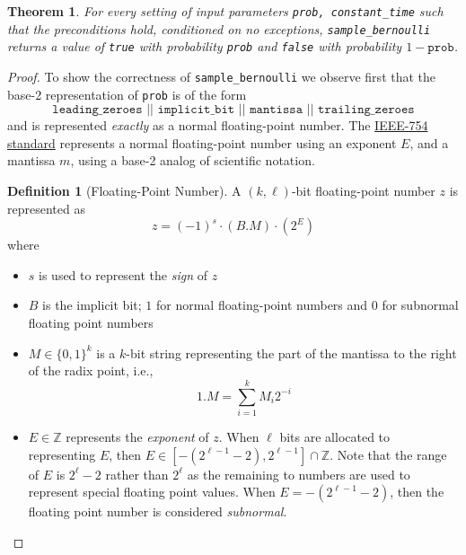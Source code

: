 \documentclass[11pt,a4paper]{article}
\newtheorem{theorem}{Theorem}[section]
\theoremstyle{definition}
\newtheorem{definition}{Definition}
\begin{document}
\begin{tcolorbox}
\begin{theorem} For every setting of input parameters \texttt{prob, constant\_time} such that the preconditions hold, conditioned on no exceptions, \texttt{sample\_bernoulli} returns a value of \texttt{true} with probability \texttt{prob} and \texttt{false} with probability $1 - \texttt{prob}$. 
\end{theorem}
\end{tcolorbox}

\begin{proof} 
To show the correctness of \texttt{sample\_bernoulli} we observe first that the base-2 representation of \texttt{prob} is of the form 
\[
\texttt{leading\_zeroes || implicit\_bit || mantissa || trailing\_zeroes}
\]
and is represented \emph{exactly} as a normal floating-point number. The \href{https://en.wikipedia.org/wiki/IEEE_754}{IEEE-754 standard} represents a normal floating-point number using an exponent $E$, and a mantissa $m$, using a base-2 analog of scientific notation. 

\begin{definition}[Floating-Point Number]
A $(k,\ell)$-bit floating-point number $z$ is represented as
\[
z = (-1)^s \cdot (B.M) \cdot (2^E) 
\]
where
\begin{itemize}
    \item $s$ is used to represent the \emph{sign} of $z$
    \item $B$ is the implicit bit; $1$ for normal floating-point numbers and $0$ for subnormal floating point numbers
    \item $M \in \{0,1\}^k$ is a $k$-bit string representing the part of the mantissa to the right of the radix point, i.e.,
    \[
    1.M = \sum_{i = 1}^k M_i2^{-i}
    \]
    \item $E \in \mathbb{Z}$ represents the \emph{exponent} of $z$. When $\ell$ bits are allocated to representing $E$, then $E \in [-(2^{\ell - 1} - 2), 2^{\ell - 1}] \cap \mathbb{Z}$. Note that the range of $E$ is $2^\ell - 2$ rather than $2^\ell$ as the remaining to numbers are used to represent special floating point values. When $E = -(2^{\ell -1} - 2)$, then the floating point number is considered \emph{subnormal}. 
\end{itemize} 
\end{definition}


\end{proof}
\end{document}
